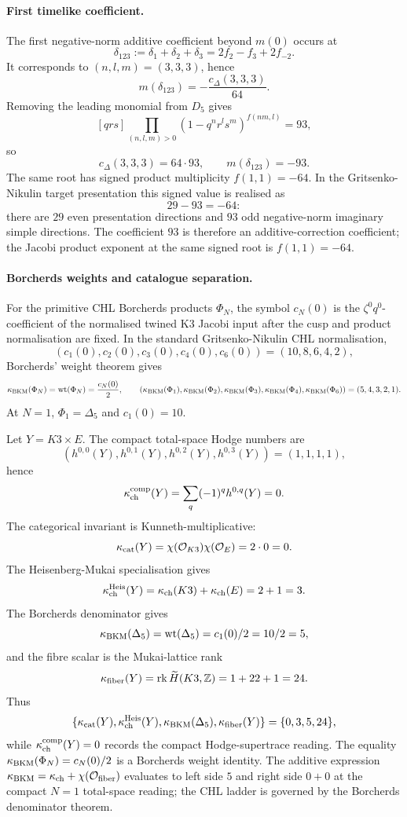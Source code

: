 \paragraph{First timelike coefficient.}
The first negative-norm additive coefficient beyond \(m(0)\) occurs at
\[
  \delta_{123}:=\delta_1+\delta_2+\delta_3
  =2f_2-f_3+2f_{-2}.
\]
It corresponds to \((n,l,m)=(3,3,3)\), hence
\[
  m(\delta_{123})=-\frac{c_\Delta(3,3,3)}{64}.
\]
Removing the leading monomial from \(D_5\) gives
\[
  \left[qrs\right]
  \prod_{(n,l,m)>0}
  (1-q^nr^ls^m)^{f(nm,l)}=93,
\]
so
\[
  c_\Delta(3,3,3)=64\cdot93,
  \qquad
  m(\delta_{123})=-93.
\]
The same root has signed product multiplicity \(f(1,1)=-64\). In the
Gritsenko-Nikulin target presentation this signed value is realised as
\[
  29-93=-64:
\]
there are \(29\) even presentation directions and \(93\) odd
negative-norm imaginary simple directions. The coefficient \(93\) is
therefore an additive-correction coefficient; the Jacobi product
exponent at the same signed root is \(f(1,1)=-64\).

\paragraph{Borcherds weights and catalogue separation.}
For the primitive CHL Borcherds products \(\Phi_N\), the symbol
\(c_N(0)\) is the \(\zeta^0q^0\)-coefficient of the normalised twined
K3 Jacobi input after the cusp and product normalisation are fixed. In
the standard Gritsenko-Nikulin CHL normalisation,
\[
  (c_1(0),c_2(0),c_3(0),c_4(0),c_6(0))
  =(10,8,6,4,2),
\]
Borcherds' weight theorem gives
\[
  \kappa_{\mathrm{BKM}}(\Phi_N)=\operatorname{wt}(\Phi_N)=\frac{c_N(0)}{2},
  \qquad
  (\kappa_{\mathrm{BKM}}(\Phi_1),\kappa_{\mathrm{BKM}}(\Phi_2),\kappa_{\mathrm{BKM}}(\Phi_3),
  \kappa_{\mathrm{BKM}}(\Phi_4),\kappa_{\mathrm{BKM}}(\Phi_6))=(5,4,3,2,1).
\]
At \(N=1\), \(\Phi_1=\Delta_5\) and \(c_1(0)=10\).

Let \(Y=K3\times E\). The compact total-space Hodge numbers are
\[
  (h^{0,0}(Y),h^{0,1}(Y),h^{0,2}(Y),h^{0,3}(Y))=(1,1,1,1),
\]
hence
\[
  \kappa_{\mathrm{ch}}^{\mathrm{comp}}(Y)=\sum_q(-1)^q h^{0,q}(Y)=0.
\]
The categorical invariant is Kunneth-multiplicative:
\[
  \kappa_{\mathrm{cat}}(Y)=\chi(\mathcal O_{K3})\chi(\mathcal O_E)=2\cdot0=0.
\]
The Heisenberg-Mukai specialisation gives
\[
  \kappa_{\mathrm{ch}}^{\mathrm{Heis}}(Y)=\kappa_{\mathrm{ch}}(K3)+\kappa_{\mathrm{ch}}(E)=2+1=3.
\]
The Borcherds denominator gives
\[
  \kappa_{\mathrm{BKM}}(\Delta_5)=\operatorname{wt}(\Delta_5)=c_1(0)/2=10/2=5,
\]
and the fibre scalar is the Mukai-lattice rank
\[
  \kappa_{\mathrm{fiber}}(Y)=\operatorname{rk}\widetilde H(K3,\mathbb Z)=1+22+1=24.
\]
Thus
\[
  \{\kappa_{\mathrm{cat}}(Y),\kappa_{\mathrm{ch}}^{\mathrm{Heis}}(Y),
  \kappa_{\mathrm{BKM}}(\Delta_5),\kappa_{\mathrm{fiber}}(Y)\}=\{0,3,5,24\},
\]
while \(\kappa_{\mathrm{ch}}^{\mathrm{comp}}(Y)=0\) records the compact Hodge-supertrace
reading. The equality \(\kappa_{\mathrm{BKM}}(\Phi_N)=c_N(0)/2\) is a Borcherds weight
identity. The additive expression
\(\kappa_{\mathrm{BKM}}=\kappa_{\mathrm{ch}}+\chi(\mathcal O_{\mathrm{fiber}})\) evaluates to left side
\(5\) and right side \(0+0\) at the compact \(N=1\) total-space
reading; the CHL ladder is governed by the Borcherds denominator
theorem.

